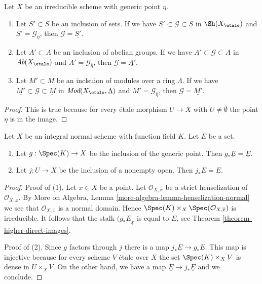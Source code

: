 \begin{lemma}
\label{lemma-irreducible-subsheaf-constant-zero}
Let $X$ be an irreducible scheme with generic point $\eta$.
\begin{enumerate}
\item Let $S' \subset S$ be an inclusion of sets. If we have
$\underline{S'} \subset \mathcal{G} \subset \underline{S}$
in $\Sh(X_\etale)$ and $S' = \mathcal{G}_{\overline{\eta}}$, then
$\mathcal{G} = \underline{S'}$.
\item Let $A' \subset A$ be an inclusion of abelian groups. If we have
$\underline{A'} \subset \mathcal{G} \subset \underline{A}$
in $\textit{Ab}(X_\etale)$ and $A' = \mathcal{G}_{\overline{\eta}}$, then
$\mathcal{G} = \underline{A'}$.
\item Let $M' \subset M$ be an inclsuion of modules over a ring $\Lambda$.
If we have $\underline{M'} \subset \mathcal{G} \subset \underline{M}$
in $\textit{Mod}(X_\etale, \underline{\Lambda})$
and $M' = \mathcal{G}_{\overline{\eta}}$, then
$\mathcal{G} = \underline{M'}$.
\end{enumerate}
\end{lemma}

\begin{proof}
This is true because for every \'etale morphism $U \to X$
with $U \not = \emptyset$ the point $\eta$ is in the image.
\end{proof}

\begin{lemma}
\label{lemma-push-constant-sheaf-from-open}
Let $X$ be an integral normal scheme with function field $K$.
Let $E$ be a set.
\begin{enumerate}
\item Let $g : \Spec(K) \to X$ be the inclusion of the generic point.
Then $g_*\underline{E} = \underline{E}$.
\item Let $j : U \to X$ be the inclusion of a nonempty open. Then
$j_*\underline{E} = \underline{E}$.
\end{enumerate}
\end{lemma}

\begin{proof}
Proof of (1). Let $x \in X$ be a point. Let $\mathcal{O}_{X, \overline{x}}$
be a strict henselization of $\mathcal{O}_{X, x}$. 
By More on Algebra, Lemma \ref{more-algebra-lemma-henselization-normal}
we see that $\mathcal{O}_{X, \overline{x}}$ is a normal domain.
Hence $\Spec(K) \times_X \Spec(\mathcal{O}_{X, \overline{x}})$
is irreducible. It follows that
the stalk $(g_*\underline{E}_{\underline{x}}$ is equal to $E$,
see Theorem \ref{theorem-higher-direct-images}.

\medskip\noindent
Proof of (2). Since $g$ factors through $j$ there is a map
$j_*\underline{E} \to g_*\underline{E}$. This map is injective because
for every scheme $V$ \'etale over $X$ the set $\Spec(K) \times_X V$
is dense in $U \times_X V$. On the other hand, we have a map
$\underline{E} \to j_*\underline{E}$ and we conclude.
\end{proof}






